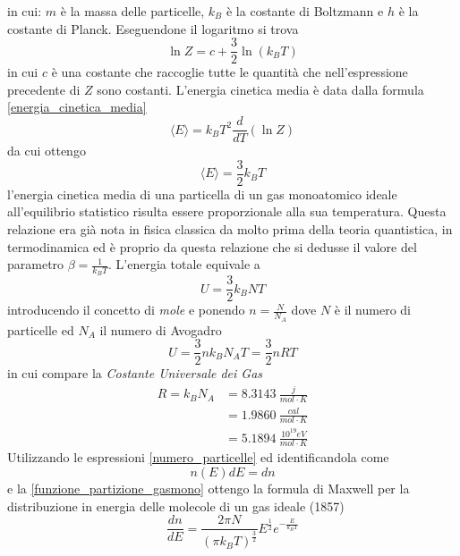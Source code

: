 in cui: $m$ è la massa delle particelle, $k_B$ è la costante di Boltzmann e $h$ è la costante di Planck.
Eseguendone il logaritmo si trova
\begin{equation}
\ln Z = c + \frac{3}{2} \ln (k_B T)
\end{equation}
in cui $c$ è una costante che raccoglie tutte le quantità che nell'espressione precedente di $Z$ sono costanti.
L'energia cinetica media è data dalla formula \ref{energia_cinetica_media}
\begin{equation}
\langle E \rangle = k_B T^2 \frac{d}{dT} (\ln Z)
\end{equation}
da cui ottengo
\begin{equation}
\langle E \rangle = \frac{3}{2} k_B T
\end{equation}
l'energia cinetica media di una particella di un gas monoatomico ideale all'equilibrio statistico risulta essere proporzionale alla sua temperatura.
Questa relazione era già nota in fisica classica da molto prima della teoria quantistica, in termodinamica ed è proprio da questa relazione che si dedusse il valore del parametro $\beta = \frac{1}{k_B T}$.
L'energia totale equivale a
\begin{equation}
U = \frac{3}{2} k_B N T
\end{equation}
introducendo il concetto di \textit{mole} e ponendo $n = \frac{N}{N_A}$ dove $N$ è il numero di particelle ed $N_A$ il numero di Avogadro
\begin{equation}
U = \frac{3}{2} n k_B N_A T = \frac{3}{2} n R T
\end{equation}
in cui compare la \textit{Costante Universale dei Gas}
\begin{equation}
\begin{split}
R = k_B N_A & = \SI{8.3143}{\frac{j}{mol \cdot K}} \\
& = \SI{1.9860}{\frac{cal}{mol \cdot K}} \\
& = \SI{5.1894}{\frac{10^{19 } eV }{mol \cdot K}}
\end{split}
\end{equation}
Utilizzando le espressioni \ref{numero_particelle} ed identificandola come
\begin{equation}
n(E) dE = d n
\end{equation}
e la \ref{funzione_partizione_gasmono}
ottengo la formula di Maxwell per la distribuzione in energia delle molecole di un gas ideale (1857)
\begin{equation}
\frac{dn}{dE} = \frac{2\pi N}{(\pi k_B T)^{ \frac{3}{2} }} E^{ \frac{1}{2} } e^{ - \frac{E}{k_B T} }
\end{equation}

